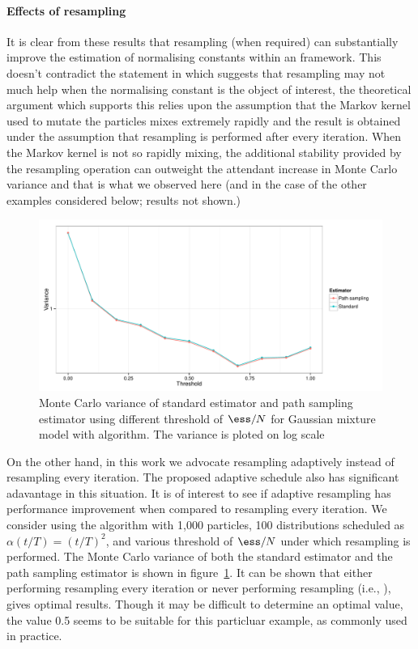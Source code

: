 \paragraph{Effects of resampling} It is clear from these results that
resampling (when required) can substantially improve the estimation of
normalising constants within an \smc framework. This doesn't contradict the
statement in \cite{DelMoral:2006hc} which suggests that resampling may not
much help when the normalising constant is the object of interest, the
theoretical argument which supports this relies upon the assumption that the
Markov kernel used to mutate the particles mixes extremely rapidly and the
result is obtained under the assumption that resampling is performed after
every iteration. When the Markov kernel is not so rapidly mixing, the
additional stability provided by the resampling operation can outweight the
attendant increase in Monte Carlo variance and that is what we observed here
(and in the case of the other examples considered below; results not shown.)

\begin{figure}
  \includegraphics[width=\linewidth]{fig/GMM_Resample}
  \caption{Monte Carlo variance of standard estimator and path sampling
    estimator using different threshold of $\ess/N$ for Gaussian mixture model
    with \smc[2] algorithm. The variance is ploted on log scale}
  \label{fig:gmm resample}
\end{figure}

On the other hand, in this work we advocate resampling adaptively instead of
resampling every iteration. The proposed adaptive schedule also has
significant adavantage in this situation. It is of interest to see if adaptive
resampling has performance improvement when compared to resampling every
iteration. We consider using the \smc[2] algorithm with 1,000 particles, 100
distributions scheduled as $\alpha(t/T) = (t/T)^2$, and various threshold of
$\ess/N$ under which resampling is performed. The Monte Carlo variance of both
the standard estimator and the path sampling estimator is shown in
figure~\ref{fig:gmm resample}. It can be shown that either performing
resampling every iteration or never performing resampling (i.e., \ais), gives
optimal results. Though it may be difficult to determine an optimal value, the
value 0.5 seems to be suitable for this particluar example, as commonly used
in practice.

